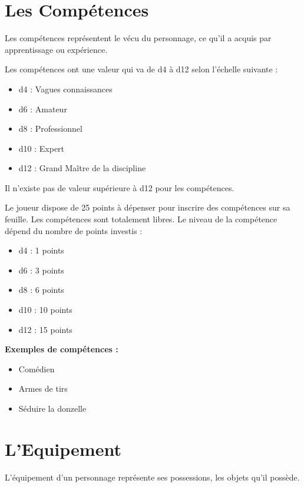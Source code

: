 \begin{multicols}{2}

\section{Les Compétences}

Les compétences représentent le vécu du personnage, ce qu'il a acquis par apprentissage ou expérience. 

Les compétences ont une valeur qui va de d4 à d12 selon l'échelle suivante : 

\begin{itemize}
\item d4 : Vagues connaissances
\item d6 : Amateur
\item d8 : Professionnel
\item d10 : Expert
\item d12 : Grand Maître de la discipline
\end{itemize}

Il n'existe pas de valeur supérieure à d12 pour les compétences.

Le joueur dispose de 25 points à dépenser pour inscrire des compétences sur sa feuille. Les compétences sont totalement libres. Le niveau de la compétence dépend du nombre de points investis :

\begin{itemize}
\item d4 : 1 points
\item d6 : 3 points
\item d8 : 6 points
\item d10 : 10 points
\item d12 : 15 points
\end{itemize}

\textbf{Exemples de compétences :}

    \begin{itemize}
        \item Comédien
        \item Armes de tirs
        \item Séduire la donzelle
    \end{itemize}

\section{L'Equipement}

L'équipement d'un personnage représente ses possessions, les objets qu'il possède.


\end{multicols}
